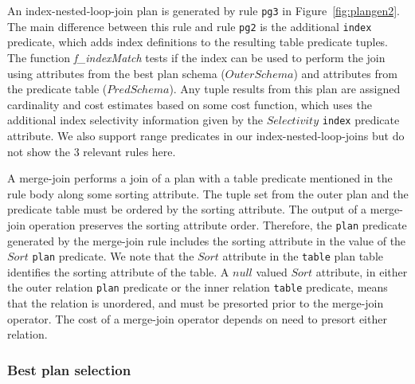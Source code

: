 \documentclass{sigmod08}
\newcommand{\ol}[1]{\texttt{\small #1}\xspace}
\begin{document}
An index-nested-loop-join plan is generated by rule \ol{pg3} in Figure~\ref{fig:plangen2}. The main
difference between this rule and rule \ol{pg2} is the additional \ol{index} predicate, which
adds index definitions to the resulting table predicate tuples. The function {\em f\_indexMatch}
tests if the index can be used to perform the join using attributes from the best plan schema ($OuterSchema$)
and attributes from the predicate table ($PredSchema$). Any tuple results from this plan are assigned 
cardinality and cost estimates based on some cost function, which uses the additional index selectivity
information given by the $Selectivity$ \ol{index} predicate attribute.
We also support range predicates in our index-nested-loop-joins but do
not show the 3 relevant rules here.

A merge-join performs a join of a plan with a table predicate mentioned in the rule body along
some sorting attribute. The tuple set from the outer plan and the predicate table must
be ordered by the sorting attribute. The output of a merge-join operation preserves
the sorting attribute order. Therefore, the \ol{plan} predicate generated by the merge-join rule 
includes the sorting attribute in the value of the $Sort$ \ol{plan} predicate. We note that the $Sort$
attribute in the \ol{table} plan table identifies the sorting attribute of the table.
A $null$ valued $Sort$ attribute, in either the outer relation \ol{plan} predicate or the inner relation
\ol{table} predicate, means that the relation is unordered, and must be presorted prior to the merge-join operator.  
The cost of a merge-join operator depends on need to presort either relation. 

\subsubsection{Best plan selection}
\label{sec:bestplan}
\end{document}
